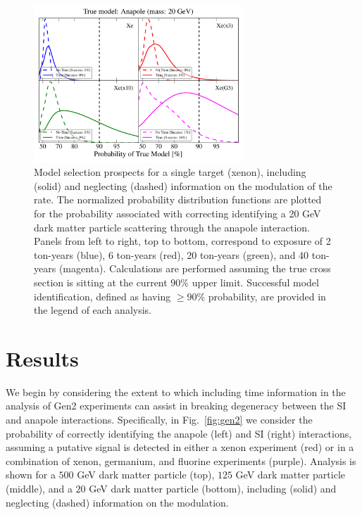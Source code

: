 \documentclass[11pt]{article}
\newcommand{\Fig}[1]{Fig.~\ref{#1}} \newcommand{\Figs}[2]{Figs.~\ref{#1} and \ref{#2}}
\begin{document}
\begin{figure}
\centering
\includegraphics[width=0.7\textwidth]{plots/PDF_20GeV_Anapole_50sims_Xe_Xe3x_Xe10x_XeG3_GF_TNT.pdf}
\caption{\label{fig:20gev_anapole_XeFull_TNT_GF}
Model selection prospects for a single target (xenon), including (solid) and neglecting (dashed) information on the modulation of the rate. The normalized probability distribution functions are plotted for the probability associated with correcting identifying a 20 GeV dark matter particle scattering through the anapole interaction. Panels from left to right, top to bottom, correspond to exposure of 2 ton-years (blue), 6 ton-years (red), 20 ton-years (green), and 40 ton-years (magenta). Calculations are performed assuming the true cross section is sitting at the current $90\%$ upper limit. Successful model identification, defined as having $\geq 90 \%$ probability, are provided in the legend of each analysis.}
\end{figure}



\section{Results}\label{sec:results}
We begin by considering the extent to which including time information in the analysis of Gen2 experiments can assist in breaking degeneracy between the SI and anapole interactions. Specifically, in \Fig{fig:gen2} we consider the probability of correctly identifying the anapole (left) and SI (right) interactions, assuming a putative signal is detected in either a xenon experiment (red) or in a combination of xenon, germanium, and fluorine experiments (purple). Analysis is shown for a $500$ GeV dark matter particle (top), $125$ GeV dark matter particle (middle), and a $20$ GeV dark matter particle (bottom), including (solid) and neglecting (dashed) information on the modulation. 
\end{document}
